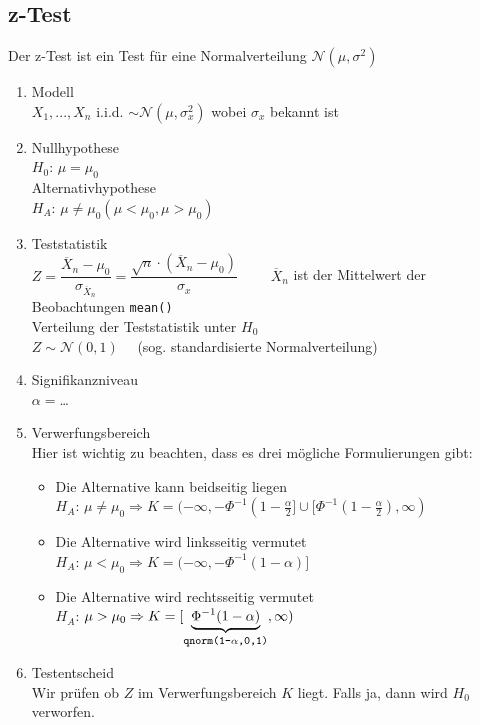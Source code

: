 \subsection{z-Test}
Der z-Test ist ein Test für eine Normalverteilung $\mathcal{N}(\mu, \sigma^2)$


\begin{enumerate}
  \item Modell \\
	  $X_1,...,X_n$ \acs{i.i.d.} $\sim\mathcal{N}(\mu, \sigma_x^2)$ 
	wobei $\sigma_x$ bekannt ist
  \item Nullhypothese \\
       	$H_0$: $ \mu=\mu_0$ \\
	Alternativhypothese \\
	$H_A$: $ \mu \neq \mu_0 (\mu < \mu_0, \mu > \mu_0)$
  \item Teststatistik \\
	  $Z=\dfrac{\overline{X}_n-\mu_0}{\sigma_{\overline{X}_n}} = 
	  \dfrac{\sqrt{n}\cdot(\overline{X}_n-\mu_0)}{\sigma_x}
	  \qquad $ $\overline{X}_n$ ist der Mittelwert der Beobachtungen
	  \verb!mean()!\\
	  Verteilung der Teststatistik unter $H_0$\\
	  $Z\sim\mathcal{N}(0,1)\quad$ (sog. standardisierte Normalverteilung)
  \item Signifikanzniveau \\
        $\alpha= $\dots
  \item Verwerfungsbereich \\
	Hier ist wichtig zu beachten, dass es drei mögliche Formulierungen
	gibt:
	\begin{itemize}
		\item	Die Alternative kann beidseitig liegen \\
		$H_A$: $\mu\neq\mu_0 \Rightarrow 
	 	K=(-\infty, -\Phi^{-1}(1-\frac{\alpha}{2}]
		\cup [\Phi^{-1}(1-\frac{\alpha}{2}), \infty)$ \\
		\item Die Alternative wird linksseitig vermutet \\
		$H_A$: $\mu<\mu_0    \Rightarrow 
		K=(-\infty, -\Phi^{-1}(1-\alpha)] $ \\
		\item Die Alternative wird rechtsseitig vermutet \\
		$H_A$: $\mu>\mu_0    \Rightarrow 
		K=[\underbrace{\Phi^{-1}(1-\alpha)}_{\footnotesize
		\verb!qnorm(1-!\alpha\verb!,0,1)!}, \infty)$ \\
	\end{itemize}

  \item Testentscheid \\
	Wir prüfen ob $Z$ im Verwerfungsbereich $K$ liegt. Falls ja, 
	dann wird $H_0$ verworfen.
\end{enumerate}


